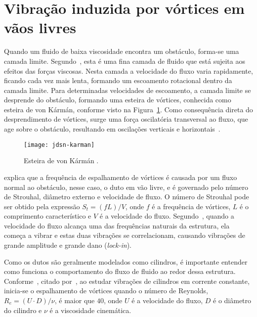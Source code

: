 \section{Vibração induzida por vórtices em vãos livres}

Quando um fluido de baixa viscosidade encontra um obstáculo, forma-se uma camada limite. Segundo~\citet{Currie2002}, esta é uma fina camada de fluido que está sujeita aos efeitos das forças viscosas. Nesta camada a velocidade do fluxo varia rapidamente, ficando cada vez mais lenta, formando um escoamento rotacional dentro da camada limite. Para determinadas velocidades de escoamento, a camada limite se desprende do obstáculo, formando uma esteira de vórtices, conhecida como esteira de von Kármán, conforme visto na Figura~\ref{fig:jdsn-karman}. Como consequência direta do desprendimento de vórtices, surge uma força oscilatória transversal ao fluxo, que age sobre o obstáculo, resultando em oscilações verticais e horizontais~\cite{Ni}.

\begin{figure}[!hbt]
\begin{center}
\texttt{[image: jdsn-karman]}
\caption{Esteira de von Kármán \cite{VandenAbeele2012}.}
\label{fig:jdsn-karman} 
\end{center}
\end{figure}

\citet{Mork2003} explica que a frequência de espalhamento de vórtices é causada por um fluxo normal ao obstáculo, nesse caso, o duto em vão livre, e é governado pelo número de Strouhal, diâmetro externo e velocidade de fluxo.
O número de Strouhal pode ser obtido pela expressão $S_t = (f L) / V$, onde $f$ é a frequência de vórtices, $L$ é o comprimento característico e $V$ é a velocidade do fluxo.
Segundo~\citet{Mork2003}, quando a velocidade do fluxo alcança uma das frequências naturais da estrutura, ela começa a vibrar e estas duas vibrações se correlacionam, causando vibrações de grande amplitude e grande dano (\textit{lock-in}).

Como os dutos são geralmente modelados como cilindros, é importante entender como funciona o comportamento do fluxo de fluido ao redor dessa estrutura.
Conforme~\citet{Batchelor1967}, citado por~\citet{Sumer1995}, ao estudar vibrações de cilindros em corrente constante, inicia-se o espalhamento de vórtices quando o número de Reynolds, $R_e = (U\cdot D)/\nu$, é maior que $40$, onde $U$ é a velocidade do fluxo, $D$ é o diâmetro do cilindro e $\nu$ é a viscosidade cinemática.

